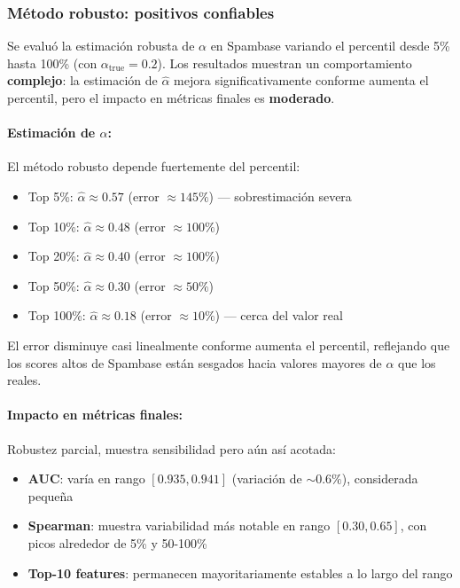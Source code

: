 \documentclass[a4paper,11pt]{article}
\begin{document}
\subsubsection{Método robusto: positivos confiables}

Se evaluó la estimación robusta de $\alpha$ en Spambase variando el percentil desde 5\% hasta 100\% (con $\alpha_{\text{true}}=0.2$). Los resultados muestran un comportamiento \textbf{complejo}: la estimación de $\hat{\alpha}$ mejora significativamente conforme aumenta el percentil, pero el impacto en métricas finales es \textbf{moderado}.

\paragraph{Estimación de $\alpha$:} El método robusto depende fuertemente del percentil:
\begin{itemize}
    \item Top 5\%: $\hat{\alpha} \approx 0.57$ (error $\approx 145\%$) — sobrestimación severa
    \item Top 10\%: $\hat{\alpha} \approx 0.48$ (error $\approx 100\%$)
    \item Top 20\%: $\hat{\alpha} \approx 0.40$ (error $\approx 100\%$)
    \item Top 50\%: $\hat{\alpha} \approx 0.30$ (error $\approx 50\%$)
    \item Top 100\%: $\hat{\alpha} \approx 0.18$ (error $\approx 10\%$) — cerca del valor real
\end{itemize}

El error disminuye casi linealmente conforme aumenta el percentil, reflejando que los scores altos de Spambase están sesgados hacia valores mayores de $\alpha$ que los reales.

\paragraph{Impacto en métricas finales:} Robustez parcial, muestra sensibilidad pero aún así acotada:

\begin{itemize}
    \item \textbf{AUC}: varía en rango $[0.935, 0.941]$ (variación de $\sim 0.6\%$), considerada pequeña
    \item \textbf{Spearman}: muestra variabilidad más notable en rango $[0.30, 0.65]$, con picos alrededor de 5\% y 50-100\%
    \item \textbf{Top-10 features}: permanecen mayoritariamente estables a lo largo del rango
\end{itemize}
\end{document}
